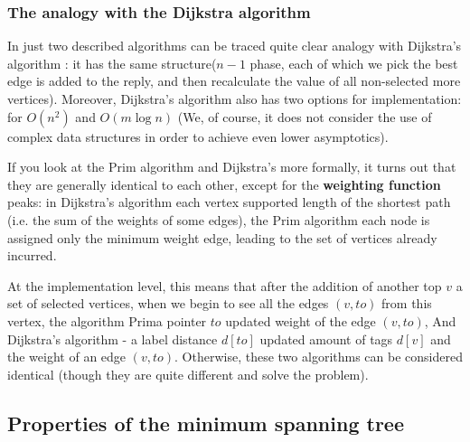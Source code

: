 \subsubsection{ The analogy with the Dijkstra algorithm }

In just two described algorithms can be traced quite clear analogy with Dijkstra's algorithm : it has the same structure($n-1$ phase, each of which we pick the best edge is added to the reply, and then recalculate the value of all non-selected more vertices). Moreover, Dijkstra's algorithm also has two options for implementation: for $O (n ^ 2)$ and $O (m \log n)$ (We, of course, it does not consider the use of complex data structures in order to achieve even lower asymptotics).

If you look at the Prim algorithm and Dijkstra's more formally, it turns out that they are generally identical to each other, except for the \textbf{weighting function} peaks: in Dijkstra's algorithm each vertex supported length of the shortest path (i.e. the sum of the weights of some edges), the Prim algorithm each node is assigned only the minimum weight edge, leading to the set of vertices already incurred.

At the implementation level, this means that after the addition of another top $v$ a set of selected vertices, when we begin to see all the edges $(v, to)$ from this vertex, the algorithm Prima pointer $to$ updated weight of the edge $(v, to)$, And Dijkstra's algorithm - a label distance $d [to]$ updated amount of tags $d [v]$ and the weight of an edge $(v, to)$. Otherwise, these two algorithms can be considered identical (though they are quite different and solve the problem).

\subsection{ Properties of the minimum spanning tree }


